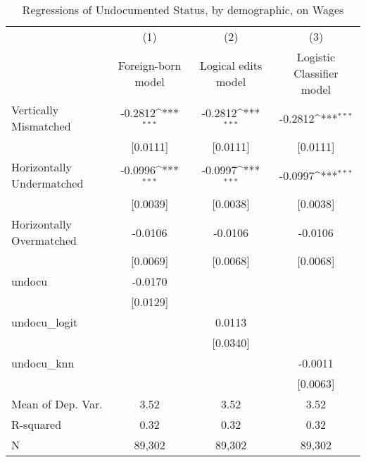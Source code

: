 \begin{table}[htbp]\centering
\def\sym#1{\ifmmode^{#1}\else\(^{#1}\)\fi}
\caption{Regressions of Undocumented Status, by demographic, on Wages}
\begin{tabular}{l*{3}{c}}
\toprule
                    &\multicolumn{1}{c}{(1)}         &\multicolumn{1}{c}{(2)}         &\multicolumn{1}{c}{(3)}         \\
                    &Foreign-born model         &Logical edits model         &Logistic Classifier model         \\
\midrule
Vertically Mismatched&     -0.2812\sym{***}&     -0.2812\sym{***}&     -0.2812\sym{***}\\
                    &    [0.0111]         &    [0.0111]         &    [0.0111]         \\
\addlinespace
Horizontally Undermatched&     -0.0996\sym{***}&     -0.0997\sym{***}&     -0.0997\sym{***}\\
                    &    [0.0039]         &    [0.0038]         &    [0.0038]         \\
\addlinespace
Horizontally Overmatched&     -0.0106         &     -0.0106         &     -0.0106         \\
                    &    [0.0069]         &    [0.0068]         &    [0.0068]         \\
\addlinespace
undocu              &     -0.0170         &                     &                     \\
                    &    [0.0129]         &                     &                     \\
\addlinespace
undocu\_logit        &                     &      0.0113         &                     \\
                    &                     &    [0.0340]         &                     \\
\addlinespace
undocu\_knn          &                     &                     &     -0.0011         \\
                    &                     &                     &    [0.0063]         \\
\midrule
Mean of Dep. Var.   &        3.52         &        3.52         &        3.52         \\
R-squared           &        0.32         &        0.32         &        0.32         \\
N                   &      89,302         &      89,302         &      89,302         \\

\end{tabular}
\end{table}
